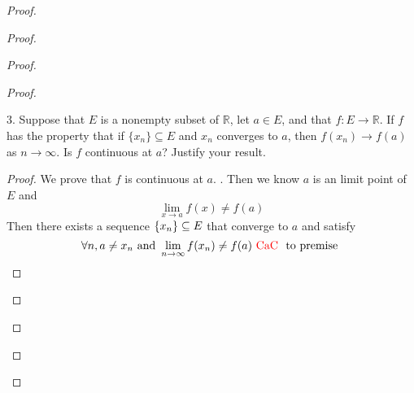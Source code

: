 \documentclass{report}
\begin{document}
\begin{proof}
\begin{proof}
\begin{proof}
\begin{proof}
\begin{question}{}{}
3. Suppose that \(E\) is a nonempty subset of \(\mathbb{R}\), let \(a \in E\), and that \(f : E \rightarrow \mathbb{R}\). If \(f\) has
the property that if \(\{x_n\} \subseteq E\) and \(x_n\) converges to \(a\), then \(f(x_n) \rightarrow f(a)\) as \(n \rightarrow \infty\). Is \(f\)
continuous at \(a\)? Justify your result.
\end{question}
\begin{proof}
We prove that $f$ is continuous at $a$. . Then we know $a$ is an limit point of $E$ and 
 \begin{equation*}
\lim_{x\to a}f(x)\neq f(a)
\end{equation*}
Then there exists a sequence $\{ x_n \}\subseteq E$ that converge to $a$ and satisfy
 \begin{equation*}
\forall n,a\neq x_n\text{ and }\lim_{n\to\infty}f(x_n)\neq f(a)\text{ \textcolor{red}{CaC} }\text{ to premise }
\end{equation*}
\end{proof}


\end{proof}
\end{proof}
\end{proof}
\end{proof}
\end{document}
